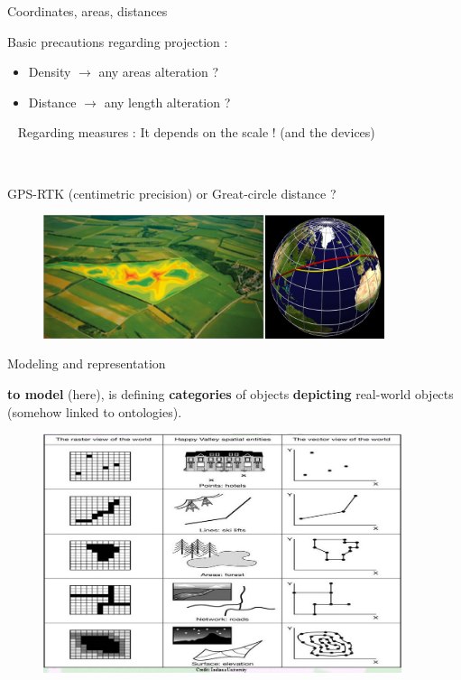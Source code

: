 \begin{frame}{Coordinates, areas, distances}

Basic precautions regarding projection : 

\begin{itemize}
  \item Density $\rightarrow$ any areas alteration ? 
  \item Distance $\rightarrow$ any length alteration ? 
\end{itemize}

~
Regarding  measures :   It depends on the scale ! (and the devices)  

~

GPS-RTK (centimetric precision) or Great-circle distance ? 

\begin{figure}
\includegraphics[width=10cm]{Echelle.png}
\end{figure}

\end{frame}


\begin{frame}{Modeling and representation}

\begin{small}
\textbf{to model} (here), is defining \textbf{categories} of objects \textbf{depicting} real-world objects (somehow linked to ontologies).
\end{small}

\begin{figure}
\includegraphics[width=10.5cm]{RasterVector.jpg}
\end{figure}

\end{frame}




